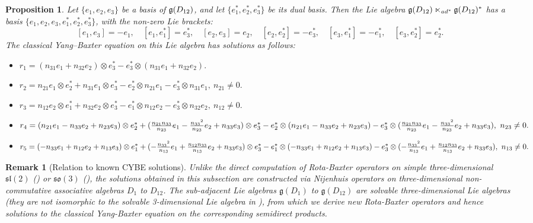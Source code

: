 \documentclass[12pt, reqno]{amsart}
\theoremstyle{plain}
\newtheorem{proposition}[theorem]{Proposition}
\newtheorem{remark}[theorem]{Remark}
\begin{document}
\begin{proposition} \label{pro:CYBED12}
Let $\{e_{1}, e_{2}, e_{3}\}$ be a basis of ${\frak g}(D_{12})$, and let $\{e^{\ast}_{1}, e^{\ast}_{2}, e^{\ast}_{3}\}$ be its dual basis. Then the Lie algebra ${\frak g}(D_{12}) \ltimes_{{\rm ad}^{\ast}} {\frak g}(D_{12})^{\ast}$ has a basis $\{e_1, e_2, e_3, e_1^{\ast}, e_2^{\ast}, e_3^{\ast}\}$, with the non-zero Lie brackets:  
$$
[e_1,e_3]=-e_1,\quad [e_1,e^{\ast}_{1}]=e^{\ast}_{3},\quad [e_2,e_3]=e_2,\quad [e_2,e^{\ast}_{2}]=-e^{\ast}_{3},\quad [e_3,e^{\ast}_{1}]=-e^{\ast}_{1},\quad [e_3,e^{\ast}_{2}]=e^{\ast}_{2}.
$$  
The classical Yang–Baxter equation on this Lie algebra has solutions as follows:
\begin{itemize}
\item[] \hskip-0.5cm  $r_1=(n_{31}e_1+n_{32}e_2)\otimes e_3^{\ast}-e_3^{\ast}\otimes(n_{31}e_1+n_{32}e_2).$
\item[]\hskip-0.5cm  $r_2=n_{21}e_1 \otimes e_2^{\ast}+n_{31}e_1 \otimes e_3^{\ast}-e_2^{\ast} \otimes n_{21}e_1- e_3^{\ast}\otimes n_{31}e_1,~n_{21}\neq0.$
\item[]\hskip-0.5cm  $r_3=n_{12}e_2 \otimes e_1^{\ast}+n_{32}e_2 \otimes e_3^{\ast}-e_1^{\ast} \otimes n_{12}e_2- e_3^{\ast}\otimes n_{32}e_2,~n_{12}\neq0.$
\item[]\hskip-0.5cm  $r_4=(n_{21}e_1-n_{33}e_2+{n_{23}}e_3) \otimes e_2^{\ast}+(\frac{n_{21}n_{33}}{n_{23}}e_1-\frac{{n_{33}}^2}{n_{23}}e_2+n_{33}e_3) \otimes e_3^{\ast}\\
    -e_2^{\ast} \otimes (n_{21}e_1-n_{33}e_2+{n_{23}}e_3)- e_3^{\ast}\otimes (\frac{n_{21}n_{33}}{n_{23}}e_1-\frac{{n_{33}}^2}{n_{23}}e_2+n_{33}e_3) ,~n_{23}\neq0.$
\item[]\hskip-0.5cm  $ r_5 = (-n_{33}e_1+n_{12}e_2+{n_{13}}e_3) \otimes e_1^{\ast}+(-\frac{{n_{33}}^2}{n_{13}}e_1+\frac{n_{12}n_{33}}{n_{13}}e_2+n_{33}e_3) \otimes e_3^{\ast}\\
  -e_1^{\ast} \otimes (-n_{33}e_1+n_{12}e_2+{n_{13}}e_3)- e_3^{\ast}\otimes (-\frac{{n_{33}}^2}{n_{13}}e_1+\frac{n_{12}n_{33}}{n_{13}}e_2+n_{33}e_3),~n_{13}\neq0.$
\end{itemize}
\end{proposition}


\begin{remark}[Relation to known CYBE solutions]\label{rem:novelty}
Unlike the direct computation of Rota-Baxter operators on simple three-dimensional $\mathfrak{sl}(2)$ (\cite{Pei}) or $\mathfrak{so}(3)$ (\cite{Jiang}), the solutions obtained in this subsection are constructed via Nijenhuis operators on three-dimensional non-commutative associative algebras $D_1$ to $D_{12}$. The sub-adjacent Lie algebras $\mathfrak{g}(D_1)$ to $\mathfrak{g}(D_{12})$ are solvable three-dimensional Lie algebras (they are not isomorphic to the solvable 3-dimensional Lie algebra in \cite{Linli-Wu}), from which we derive new Rota-Baxter operators and hence solutions to the classical Yang-Baxter equation on the corresponding semidirect products.
\end{remark}
\end{document}
